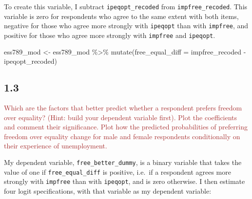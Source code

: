\documentclass[
]{article}
\newenvironment{Shaded}{\begin{snugshade}}{\end{snugshade}}
\newcommand{\AttributeTok}[1]{\textcolor[rgb]{0.77,0.63,0.00}{#1}}
\newcommand{\FunctionTok}[1]{\textcolor[rgb]{0.00,0.00,0.00}{#1}}
\newcommand{\NormalTok}[1]{#1}
\newcommand{\OtherTok}[1]{\textcolor[rgb]{0.56,0.35,0.01}{#1}}
\newcommand{\SpecialCharTok}[1]{\textcolor[rgb]{0.00,0.00,0.00}{#1}}
\begin{document}
To create this variable, I subtract \texttt{ipeqopt\_recoded} from
\texttt{impfree\_recoded}. This variable is zero for respondents who
agree to the same extent with both items, negative for those who agree
more strongly with \texttt{ipeqopt} than with \texttt{impfree}, and
positive for those who agree more strongly with \texttt{impfree} and
\texttt{ipeqopt}.

\begin{Shaded}
\begin{Highlighting}[]
\NormalTok{ess789\_mod }\OtherTok{\textless{}{-}}\NormalTok{ ess789\_mod }\SpecialCharTok{\%\textgreater{}\%}
  \FunctionTok{mutate}\NormalTok{(}\AttributeTok{free\_equal\_diff =}\NormalTok{ impfree\_recoded }\SpecialCharTok{{-}}\NormalTok{ ipeqopt\_recoded)}
\end{Highlighting}
\end{Shaded}

\hypertarget{section-2}{%
\subsection{1.3}\label{section-2}}

\textcolor{brown}{Which are the factors that better predict whether a respondent prefers freedom over equality? (Hint: build your dependent variable first). Plot the coefficients and comment their significance. Plot how the predicted probabilities of preferring freedom over equality change for male and female respondents conditionally on their experience of unemployment.}

My dependent variable, \texttt{free\_better\_dummy}, is a binary
variable that takes the value of one if \texttt{free\_equal\_diff} is
positive, i.e.~if a respondent agrees more strongly with
\texttt{impfree} than with \texttt{ipeqopt}, and is zero otherwise. I
then estimate four logit specifications, with that variable as my
dependent variable:
\end{document}
